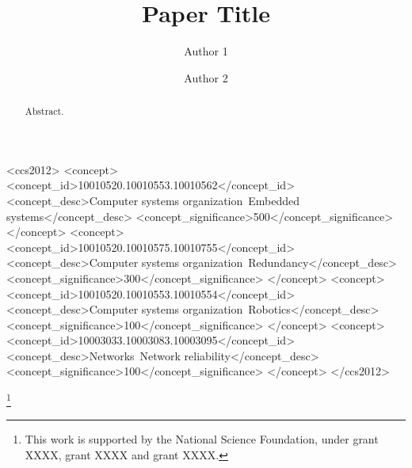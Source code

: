 \documentclass[acmtog]{acmart}
\begin{document}
\title{Paper Title} 
\author{Author 1} 
\author{Author 2} 

\renewcommand\shortauthors{Author 1 and Author 2}

\begin{abstract}
   Abstract.
\end{abstract}


%
%
\begin{CCSXML}
<ccs2012>
 <concept>
  <concept_id>10010520.10010553.10010562</concept_id>
  <concept_desc>Computer systems organization~Embedded systems</concept_desc>
  <concept_significance>500</concept_significance>
 </concept>
 <concept>
  <concept_id>10010520.10010575.10010755</concept_id>
  <concept_desc>Computer systems organization~Redundancy</concept_desc>
  <concept_significance>300</concept_significance>
 </concept>
 <concept>
  <concept_id>10010520.10010553.10010554</concept_id>
  <concept_desc>Computer systems organization~Robotics</concept_desc>
  <concept_significance>100</concept_significance>
 </concept>
 <concept>
  <concept_id>10003033.10003083.10003095</concept_id>
  <concept_desc>Networks~Network reliability</concept_desc>
  <concept_significance>100</concept_significance>
 </concept>
</ccs2012>  
\end{CCSXML}


%
%




\thanks{This work is supported by the National Science Foundation, under grant XXXX, grant XXXX and grant XXXX.}

\end{document}

